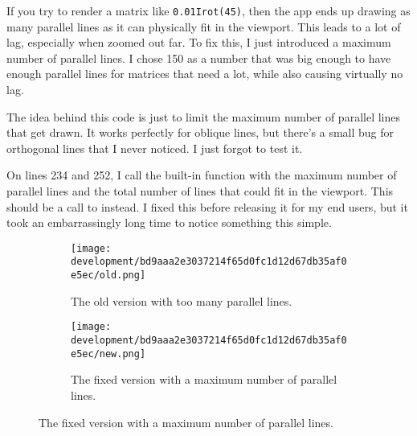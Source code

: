 \documentclass[../development.tex]{subfiles}
\begin{document}
If you try to render a matrix like \texttt{0.01Irot(45)}, then the app ends up drawing as many parallel lines as it can physically fit in the viewport. This leads to a lot of lag, especially when zoomed out far. To fix this, I just introduced a maximum number of parallel lines. I chose 150 as a number that was big enough to have enough parallel lines for matrices that need a lot, while also causing virtually no lag.



The idea behind this code is just to limit the maximum number of parallel lines that get drawn. It works perfectly for oblique lines, but there's a small bug for orthogonal lines that I never noticed. I just forgot to test it.

On lines 234 and 252, I call the built-in  function with the maximum number of parallel lines and the total number of lines that could fit in the viewport. This should be a call to  instead. I fixed this before releasing it for my end users, but it took an embarrassingly long time to notice something this simple.

\begin{figure}[H]
	\hspace{0.005\linewidth}
	\centering
	\begin{minipage}{0.48\linewidth}
		\centering
		\begin{figure}[H]
			\centering
			\texttt{[image: development/bd9aaa2e3037214f65d0fc1d12d67db35af0e5ec/old.png]}
			\caption{The old version with too many parallel lines.}
			\label{fig:development:bd9aaa2e3037214f65d0fc1d12d67db35af0e5ec:old.png}
		\end{figure}
	\end{minipage}%
	\hspace{0.015\linewidth}
	\begin{minipage}{0.48\linewidth}
		\centering
		\begin{figure}[H]
			\centering
			\texttt{[image: development/bd9aaa2e3037214f65d0fc1d12d67db35af0e5ec/new.png]}
			\caption{The fixed version with a maximum number of parallel lines.}
			\label{fig:development:bd9aaa2e3037214f65d0fc1d12d67db35af0e5ec:new.png}
		\end{figure}
	\end{minipage}
	\hspace{0.005\linewidth}
	\vspace{-1em}
\end{figure}
\end{document}

